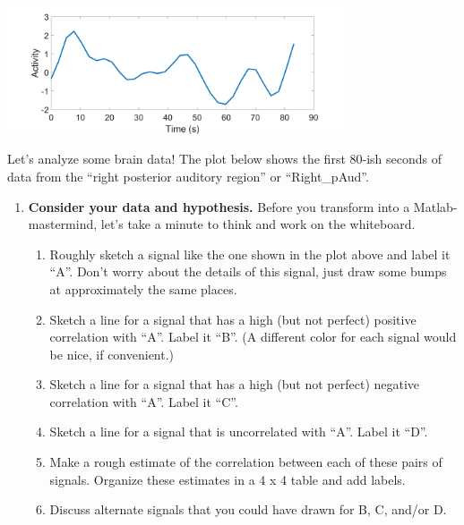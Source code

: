 \begin{center}
\includegraphics[width=0.75\textwidth]{FacesDay4/figs/brainrpaud80.png}
\end{center}

Let's analyze some brain data! The plot below shows the first 80-ish seconds of data from the ``right posterior auditory region'' or ``Right\_pAud''.

\begin{prob}
\begin{enumerate}
\item \textbf{Consider your data and hypothesis.} Before you transform into a Matlab-mastermind, let's take a minute to think and work on the whiteboard.
\begin{enumerate}
\item Roughly sketch a signal like the one shown in the plot above and label it ``A''.  Don't worry about the details of this signal, just draw some bumps at approximately the same places.
\item Sketch a line for a signal that has a high (but not perfect) positive correlation with ``A''. Label it ``B''. (A different color for each signal would be nice, if convenient.)
\item Sketch a line for a signal that has a high (but not perfect) negative correlation with ``A''. Label it ``C''.
\item Sketch a line for a signal that is uncorrelated with ``A''. Label it ``D''.
\item Make a rough estimate of the correlation between each of these pairs of signals. Organize these estimates in a 4 x 4 table and add labels.
\item Discuss alternate signals that you could have drawn for B, C, and/or D.
\end{enumerate}


\end{enumerate}
\end{prob}
